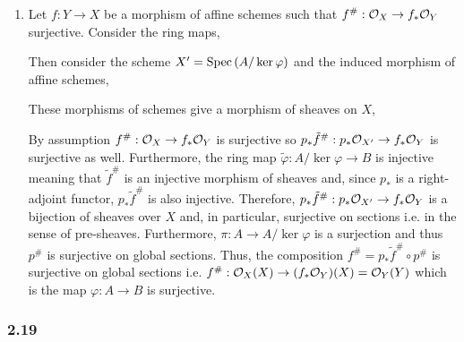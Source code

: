 \documentclass[12pt]{article}
\begin{document}
\begin{enumerate}
\item Let $f : Y \to X$ be a morphism of affine schemes such that $f^\# : \mathcal{O}_{X} \to f_* \mathcal{O}_{Y}$ surjective. Consider the ring maps,
\begin{center}
\end{center}
Then consider the scheme $X' = \mathrm{Spec}\left( A / \ker{\varphi} \right)$ and the induced morphism of affine schemes,
\begin{center}
\end{center}
These morphisms of schemes give a morphism of sheaves on $X$,
\begin{center}
\end{center}
By assumption $f^\# : \mathcal{O}_{X} \to f_* \mathcal{O}_{Y}$ is surjective so $p_* \tilde{f}^\# : p_* \mathcal{O}_{X'} \to f_* \mathcal{O}_{Y}$ is surjective as well. Furthermore, the ring map $\tilde{\varphi} : A / \ker{\varphi} \to B$ is injective meaning that $\tilde{f}^\#$ is an injective morphism of sheaves and, since $p_*$ is a right-adjoint functor, $p_* \tilde{f}^\#$ is also injective. Therefore, $p_* \tilde{f}^\# : p_* \mathcal{O}_{X'} \to f_* \mathcal{O}_{Y}$ is a bijection of sheaves over $X$ and, in particular, surjective on sections i.e. in the sense of pre-sheaves. Furthermore, $\pi : A \to A / \ker{\varphi}$ is a surjection and thus $p^\#$ is surjective on global sections. Thus, the composition $f^\# = p_* \tilde{f}^\# \circ p^\#$ is surjective on global sections i.e. $f^\# : \mathcal{O}_{X}(X) \to (f_* \mathcal{O}_{Y})(X) = \mathcal{O}_{Y}(Y)$ which is the map $\varphi : A \to B$ is surjective. 
\end{enumerate}

\subsubsection{2.19}
\end{document}
